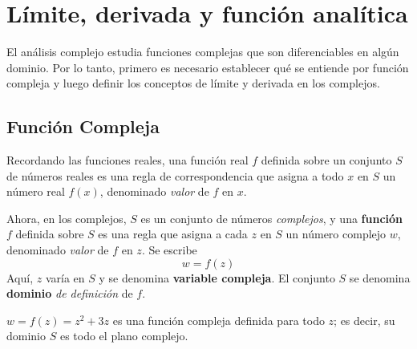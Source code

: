 \section{Límite, derivada y función analítica}

El análisis complejo estudia funciones complejas que son diferenciables en algún dominio. Por lo tanto, primero es necesario establecer qué se entiende por función compleja y luego definir los conceptos de límite y derivada en los complejos.

\subsection{Función Compleja}

Recordando las funciones reales, una función real $f$ definida sobre un conjunto $S$ de números reales es una regla de correspondencia que asigna a todo $x$ en $S$ un número real $f(x)$, denominado \textit{valor} de $f$ en $x$.

Ahora, en los complejos, $S$ es un conjunto de números \textit{complejos}, y una \textbf{función} $f$ definida sobre $S$ es una regla que asigna a cada $z$ en $S$ un número complejo $w$, denominado \textit{valor} de $f$ en $z$. Se escribe
\begin{equation*}
  w=f(z)
\end{equation*}
Aquí, $z$ varía en $S$ y se denomina \textbf{variable compleja}. El conjunto $S$ se denomina \textbf{dominio} \textit{de definición} de $f$.

\begin{example}
  $w=f(z)=z^2+3z$ es una función compleja definida para todo $z$; es decir, su dominio $S$ es todo el plano complejo.
\end{example}

